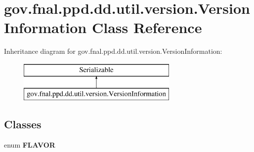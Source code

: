 \hypertarget{classgov_1_1fnal_1_1ppd_1_1dd_1_1util_1_1version_1_1VersionInformation}{\section{gov.\-fnal.\-ppd.\-dd.\-util.\-version.\-Version\-Information Class Reference}
\label{classgov_1_1fnal_1_1ppd_1_1dd_1_1util_1_1version_1_1VersionInformation}
}
Inheritance diagram for gov.\-fnal.\-ppd.\-dd.\-util.\-version.\-Version\-Information\-:\begin{figure}[H]
\begin{center}
\leavevmode
\includegraphics[height=2.000000cm]{classgov_1_1fnal_1_1ppd_1_1dd_1_1util_1_1version_1_1VersionInformation}
\end{center}
\end{figure}
\subsection*{Classes}
\begin{DoxyCompactItemize}
\item 
enum {\bfseries F\-L\-A\-V\-O\-R}
\end{DoxyCompactItemize}
